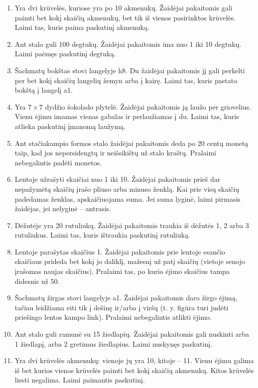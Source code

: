 \documentclass[11pt,a4paper]{scrartcl}
\begin{document}
\begin{enumerate}
    \renewcommand{\labelenumi}{\textbf{\theenumi.}}
    \item Yra dvi krūvelės, kuriose yra po 10 akmenukų. Žaidėjai pakaitomis gali paimti bet kokį skaičių akmenukų, bet tik iš vienos pasirinktos krūvelės. Laimi tas, kuris paima paskutinį akmenuką.
    \item Ant stalo guli 100 degtukų. Žaidėjai pakaitomis ima nuo 1 iki 10 degtukų. Laimi paėmęs paskutinį degtuką.
    \item Šachmatų bokštas stovi langelyje h8. Du žaidėjai pakaitomis jį gali perkelti per bet kokį skaičių langelių žemyn arba į kairę. Laimi tas, kuris pastato bokštą į langelį a1.
    \item Yra $7 \times 7$ dydžio šokolado plytelė. Žaidėjai pakaitomis ją laužo per griovelius. Vienu ėjimu imamas vienas gabalas ir perlaužiamas į du. Laimi tas, kuris atlieka paskutinį įmanomą laužymą.
    \item Ant stačiakampio formos stalo žaidėjai pakaitomis deda po 20 centų monetą taip, kad jos nepersidengtų ir neišsikištų už stalo kraštų. Pralaimi nebegalintis padėti monetos.
    \item Lentoje užrašyti skaičiai nuo 1 iki 10. Žaidėjai pakaitomis prieš dar nepažymėtą skaičių įrašo pliuso arba minuso ženklą. Kai prie visų skaičių padedamas ženklas, apskaičiuojama suma. Jei suma lyginė, laimi pirmasis žaidėjas, jei nelyginė – antrasis.
    \item Dėžutėje yra 20 rutuliukų. Žaidėjai pakaitomis traukia iš dėžutės 1, 2 arba 3 rutuliukus. Laimi tas, kuris ištraukia paskutinį rutuliuką.
    \item Lentoje parašytas skaičius 1. Žaidėjai pakaitomis prie lentoje esančio skaičiaus prideda bet kokį jo daliklį, mažesnį už patį skaičių (vietoje senojo įrašomas naujas skaičius). Pralaimi tas, po kurio ėjimo skaičius tampa didesnis už 50.
    \item Šachmatų žirgas stovi langelyje a1. Žaidėjai pakaitomis daro žirgo ėjimą, tačiau leidžiama eiti tik į dešinę ir/arba į viršų (t. y. figūra turi judėti priešingo lentos kampo link). Pralaimi nebegalintis atlikti ėjimo.
    \item Ant stalo guli ramunė su 15 žiedlapių. Žaidėjai pakaitomis gali nuskinti arba 1 žiedlapį, arba 2 gretimus žiedlapius. Laimi nuskynęs paskutinį.
    \item Yra dvi krūvelės akmenukų: vienoje jų yra 10, kitoje – 11. Vienu ėjimu galima iš bet kurios vienos krūvelės paimti bet kokį skaičių akmenukų. Kitos krūvelės liesti negalima. Laimi paimantis paskutinį.

\end{enumerate}
\end{document}
